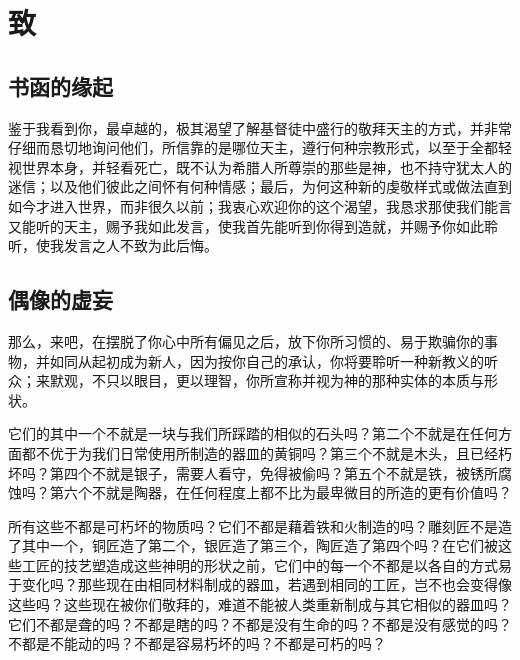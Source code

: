 
\chapter{致}



\section{书函的缘起}

鉴于我看到你，最卓越的，极其渴望了解基督徒中盛行的敬拜天主的方式，并非常仔细而恳切地询问他们，所信靠的是哪位天主，遵行何种宗教形式，以至于全都轻视世界本身，并轻看死亡，既不认为希腊人所尊崇的那些是神，也不持守犹太人的迷信；以及他们彼此之间怀有何种情感；最后，为何这种新的虔敬样式或做法直到如今才进入世界，而非很久以前；我衷心欢迎你的这个渴望，我恳求那使我们能言又能听的天主，赐予我如此发言，使我首先能听到你得到造就，并赐予你如此聆听，使我发言之人不致为此后悔。\par


\section{偶像的虚妄}

那么，来吧，在摆脱了你心中所有偏见之后，放下你所习惯的、易于欺骗你的事物，并如同从起初成为新人，因为按你自己的承认，你将要聆听一种新教义的听众；来默观，不只以眼目，更以理智，你所宣称并视为神的那种实体的本质与形状。\par

它们的其中一个不就是一块与我们所踩踏的相似的石头吗？第二个不就是在任何方面都不优于为我们日常使用所制造的器皿的黄铜吗？第三个不就是木头，且已经朽坏吗？第四个不就是银子，需要人看守，免得被偷吗？第五个不就是铁，被锈所腐蚀吗？第六个不就是陶器，在任何程度上都不比为最卑微目的所造的更有价值吗？\par

所有这些不都是可朽坏的物质吗？它们不都是藉着铁和火制造的吗？雕刻匠不是造了其中一个，铜匠造了第二个，银匠造了第三个，陶匠造了第四个吗？在它们被这些工匠的技艺塑造成这些神明的形状之前，它们中的每一个不都是以各自的方式易于变化吗？那些现在由相同材料制成的器皿，若遇到相同的工匠，岂不也会变得像这些吗？这些现在被你们敬拜的，难道不能被人类重新制成与其它相似的器皿吗？它们不都是聋的吗？不都是瞎的吗？不都是没有生命的吗？不都是没有感觉的吗？不都是不能动的吗？不都是容易朽坏的吗？不都是可朽的吗？\par

